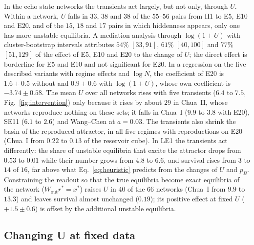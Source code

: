 In the echo state networks the transients act largely, but not only, through $U$. Within a network, $U$ falls in $33$, $38$
and $38$ of the $55$--$56$ pairs from H1 to E5, E10 and E20, and of the $15$, $18$ and $17$ pairs in which hiddenness appears,
only one has more unstable equilibria. A mediation analysis through $\log(1+U)$ with cluster-bootstrap intervals attributes
$54\%$ $[33,91]$, $61\%$ $[40,100]$ and $77\%$ $[51,129]$ of the effect of E5, E10 and E20 to the change of $U$; the direct
effect is borderline for E5 and E10 and not significant for E20. In a regression on the five described variants with regime
effects and $\log N$, the coefficient of E20 is $1.6\pm0.5$ without and $0.9\pm0.6$ with $\log(1+U)$, whose own coefficient
is $-3.74\pm0.58$. The mean $U$ over all networks rises with five transients ($6.4$ to $7.5$, Fig.~\ref{fig:intervention})
only because it rises by about $29$ in Chua~II, whose networks reproduce nothing on these sets; it falls in Chua~I ($9.9$ to
$3.8$ with E20), SE11 ($6.1$ to $2.6$) and Wang--Chen at $a=0.03$. The transients also shrink the basin of the reproduced
attractor, in all five regimes with reproductions on E20 (Chua~I from $0.22$ to $0.13$ of the reservoir cube). In LE1 the
transients act differently: the share of unstable equilibria that excite the attractor drops from $0.53$ to $0.01$ while
their number grows from $4.8$ to $6.6$, and survival rises from $3$ to $14$ of $16$, far above what
Eq.~\eqref{eq:heuristic} predicts from the changes of $U$ and $p_B$. Constraining the readout so that the true equilibria
become exact equilibria of the network ($W_{\mathrm{out}}r^*=x^*$) raises $U$ in $40$ of the $66$ networks (Chua~I from
$9.9$ to $13.3$) and leaves survival almost unchanged ($0.19$); its positive effect at fixed $U$ ($+1.5\pm0.6$) is offset by
the additional unstable equilibria.

\subsection{Changing U at fixed data}
\label{sec:penalty}

